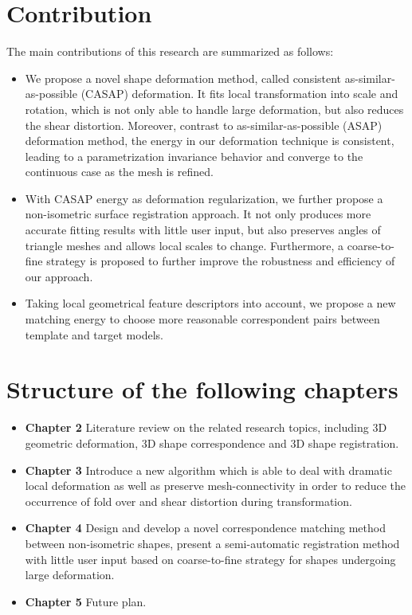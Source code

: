 \section{Contribution}
The main contributions of this research are summarized as follows:
\begin{itemize}
  \item We propose a novel shape deformation method, called consistent as-similar-as-possible (CASAP) deformation. It fits local transformation into scale and rotation, which is not only able to handle large deformation, but also reduces the shear distortion. Moreover, contrast to as-similar-as-possible (ASAP) deformation method, the energy in our deformation technique is consistent, leading to a parametrization invariance behavior and converge to the continuous case as the mesh is refined.


  \item With CASAP energy as deformation regularization, we further propose a non-isometric surface registration approach. It not only produces more accurate fitting results with little user input, but also preserves angles of triangle meshes and allows local scales to change. Furthermore, a coarse-to-fine strategy is proposed to further improve the robustness and efficiency of our approach.\\

       \item Taking local geometrical feature descriptors into account, we propose a new matching energy to choose more reasonable correspondent pairs between template and target models.\\
\end{itemize}

\section{Structure of the following chapters}

\begin{itemize}
\item \textbf{Chapter 2} Literature review on the related research topics, including 3D geometric deformation, 3D shape correspondence and 3D shape registration.

\item \textbf{Chapter 3} Introduce a new algorithm which is able to deal with dramatic local deformation as well as preserve mesh-connectivity in order to reduce the occurrence of fold over and shear distortion during transformation.

\item \textbf{Chapter 4} Design and develop a novel correspondence matching method between non-isometric shapes, present a semi-automatic registration method with little user input based on coarse-to-fine strategy for shapes undergoing large deformation.

\item \textbf{Chapter 5} Future plan.
\end{itemize}


\ifx\isEmbedded\undefined
{}
\pagebreak

\fi
